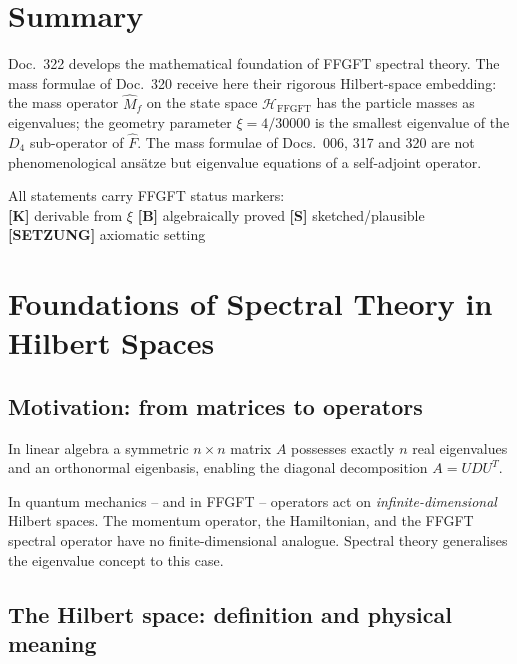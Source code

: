 

\section*{Summary}

Doc.~322 develops the mathematical foundation of FFGFT spectral theory.
The mass formulae of Doc.~320 receive here their rigorous Hilbert-space
embedding: the mass operator $\hat{M}_f$ on the state space
$\mathcal{H}_{\mathrm{FFGFT}}$ has the particle masses as eigenvalues;
the geometry parameter $\xi = 4/30000$ is the smallest eigenvalue of the
$D_4$ sub-operator of $\hat{F}$.
The mass formulae of Docs.~006, 317 and 320 are not
phenomenological ans\"{a}tze but eigenvalue equations of a self-adjoint
operator.

\begin{keyresult}
All statements carry FFGFT status markers:\\
\textbf{[K]} derivable from $\xi$ \quad
\textbf{[B]} algebraically proved \quad
\textbf{[S]} sketched/plausible \quad
\textbf{[SETZUNG]} axiomatic setting
\end{keyresult}

\section{Foundations of Spectral Theory in Hilbert Spaces}

\subsection{Motivation: from matrices to operators}

In linear algebra a symmetric $n\times n$ matrix $A$ possesses exactly
$n$ real eigenvalues and an orthonormal eigenbasis, enabling the
diagonal decomposition $A = UDU^T$.

In quantum mechanics -- and in FFGFT -- operators act on
\emph{infinite-dimensional} Hilbert spaces. The momentum operator,
the Hamiltonian, and the FFGFT spectral operator have no
finite-dimensional analogue. Spectral theory generalises the
eigenvalue concept to this case.

\subsection{The Hilbert space: definition and physical meaning}

